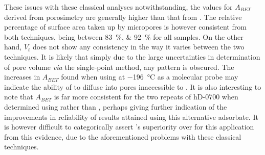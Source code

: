 These issues with these classical analyses notwithstanding, the values for $A_{BET}$ derived from  porosimetry are generally higher than that from . The relative percentage of surface area taken up by \glspl{micropore} is however consistent from both techniques, being between \qtylist[list-units=single]{83;92}{\percent} for all samples. On the other hand, $V_t$ does not show any consistency in the way it varies between the two techniques. It is likely that simply due to the large uncertainties in determination of pore volume \textit{via} the single-point method, any pattern is obscured. The increases in $A_{BET}$ found when using  at \qty{-196}{\degreeCelsius} as a molecular probe may indicate the ability of  to diffuse into pores inaccessible to . It is also interesting to note that $A_{BET}$ is far more consistent for the two repeats of hD-0700 when determined using  rather than , perhaps giving further indication of the improvements in reliability of results attained using this alternative \gls{adsorbate}. It is however difficult to categorically assert 's superiority over  for this application from this evidence, due to the aforementioned problems with these classical techniques. 

